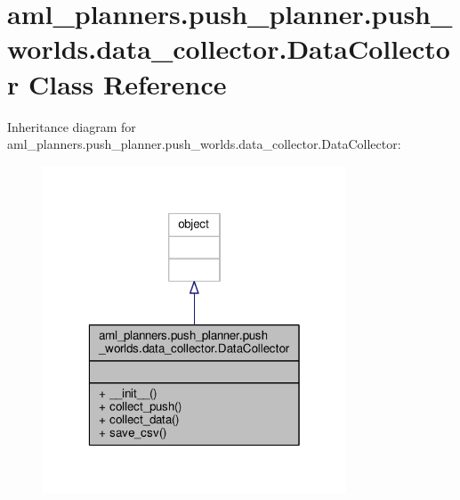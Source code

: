 \hypertarget{classaml__planners_1_1push__planner_1_1push__worlds_1_1data__collector_1_1_data_collector}{\section{aml\-\_\-planners.\-push\-\_\-planner.\-push\-\_\-worlds.\-data\-\_\-collector.\-Data\-Collector Class Reference}
\label{classaml__planners_1_1push__planner_1_1push__worlds_1_1data__collector_1_1_data_collector}
}


Inheritance diagram for aml\-\_\-planners.\-push\-\_\-planner.\-push\-\_\-worlds.\-data\-\_\-collector.\-Data\-Collector\-:\nopagebreak
\begin{figure}[H]
\begin{center}
\leavevmode
\includegraphics[width=256pt]{classaml__planners_1_1push__planner_1_1push__worlds_1_1data__collector_1_1_data_collector__inherit__graph}
\end{center}
\end{figure}


